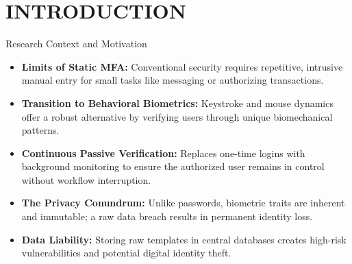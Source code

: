 
\section{INTRODUCTION}

\begin{frame}{Research Context and Motivation}
    \begin{itemize}
        \item \textbf{Limits of Static MFA:} Conventional security requires repetitive, intrusive manual entry for small tasks like messaging or authorizing transactions.
        \item \textbf{Transition to Behavioral Biometrics:} Keystroke and mouse dynamics offer a robust alternative by verifying users through unique biomechanical patterns.
        \item \textbf{Continuous Passive Verification:} Replaces one-time logins with background monitoring to ensure the authorized user remains in control without workflow interruption.
        \item \textbf{The Privacy Conundrum:} Unlike passwords, biometric traits are inherent and immutable; a raw data breach results in permanent identity loss.
        \item \textbf{Data Liability:} Storing raw templates in central databases creates high-risk vulnerabilities and potential digital identity theft.
    \end{itemize}
\end{frame}